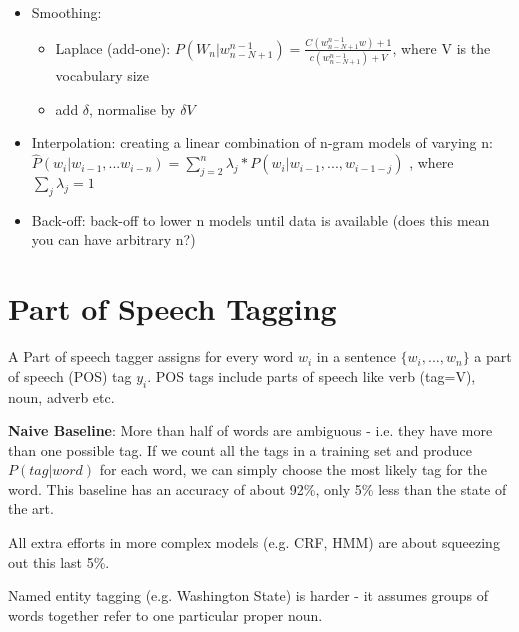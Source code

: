\documentclass[]{article}
\begin{document}
\begin{itemize}
		\item Smoothing: 
		
			\begin{itemize}
				\item Laplace (add-one): $P(W_n | w_{n - N + 1}^{n-1}) = \frac{C( w_{n - N + 1}^{n-1}w) + 1}{c( w_{n - N + 1}^{n-1}) + V}$, where V is the vocabulary size
				
				\item add $\delta$, normalise by $\delta V$
			
			\end{itemize}
		
	\item Interpolation: creating a linear combination of n-gram models of varying n: $\hat{P}(w_i | w_{i-1},...w_{i-n}) = \sum_{j=2}^{n} \lambda_j * P(w_i | w_{i-1},...,w_{i-1-j})$ , where $\sum_{j}\lambda_j = 1$ 
	
	\item Back-off: back-off to lower n models until data is available (does this mean you can have arbitrary n?)
	
	\end{itemize}
	
	
	
	\clearpage
	\section{Part of Speech Tagging}
	
	A Part of speech tagger assigns for every word $w_i$ in a sentence $\{w_i, ..., w_n\}$ a part of speech (POS) tag $y_i$. POS tags include parts of speech like verb (tag=V), noun, adverb etc.
	
	\textbf{Naive Baseline}: More than half of words are ambiguous - i.e. they have more than one possible tag. If we count all the tags in a training set and produce $P(tag | word)$ for each word, we can simply choose the most likely tag for the word. This baseline has an accuracy of about 92\%, only 5\% less than the state of the art. 
	
	All extra efforts in more complex models (e.g. CRF, HMM) are about squeezing out this last 5\%. 
	
	Named entity tagging (e.g. Washington State) is harder - it assumes groups of words together refer to one particular proper noun. 
	
\end{document}
